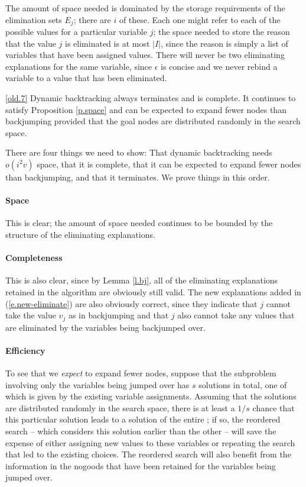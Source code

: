 \proof The amount of space needed is dominated by the storage
requirements of the elimination sets $E_j$; there are $i$ of these.
Each one might refer to each of the possible values for a particular
variable $j$; the space needed to store the reason that the value $j$
is eliminated is at most $|I|$, since the reason is simply a list of
variables that have been assigned values.  There will never be two
eliminating explanations for the same variable, since $\epsilon$ is
concise and we never rebind a variable to a value that has been
eliminated.\proofend

\begin{oldtheorem}{\ref{old.7}} Dynamic backtracking always terminates
and is complete.  It continues to satisfy Proposition \ref{p.space}
and can be expected to expand fewer nodes than backjumping provided
that the goal nodes are distributed randomly in the search space.
 \end{oldtheorem}

\proof There are four things we need to show: That dynamic
backtracking needs $o(i^2v)$ space, that it is complete, that it can be
expected to expand fewer nodes than backjumping, and that it
terminates.  We prove things in this order.

\paragraph{Space} This is clear; the amount of space needed continues
to be bounded by the structure of the eliminating explanations.

\paragraph{Completeness} This is also clear, since by Lemma
\ref{l.bj}, all of the eliminating explanations retained in the
algorithm are obviously still valid.  The new explanations added in
(\ref{e.new-eliminate}) are also obviously correct, since they
indicate that $j$ cannot take the value $v_j$ as in backjumping and
that $j$ also cannot take any values that are eliminated by the
variables being backjumped over.

\paragraph{Efficiency} To see that we {\em expect\/} to expand fewer
nodes, suppose that the subproblem involving only the variables being
jumped over has $s$ solutions in total, one of which is given by the
existing variable assignments.  Assuming that the solutions are
distributed randomly in the search space, there is at least a $1/s$
chance that this particular solution leads to a solution of the entire
\csp; if so, the reordered search -- which considers this solution
earlier than the other -- will save the expense of either assigning
new values to these variables or repeating the search that led to the
existing choices.  The reordered search will also benefit from the
information in the nogoods that have been retained for the variables
being jumped over.

